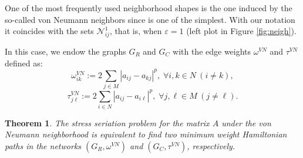 \documentclass[a4paper,11pt, reqno]{amsart}
\newtheorem{thm}{Theorem}
\def\N{\mathcal{N}}
\begin{document}
One of the most frequently used neighborhood shapes is the one induced by the so-called von Neumann neighbors since is one of the 
simplest. With our notation it coincides with the sets $\N_{ij}^1$, that is, when $\varepsilon=1$ (left plot in Figure \ref{fig:neigh}). 

In this case, we endow the graphs $G_R$ and $G_C$ with the edge weights $\omega^{VN}$ and $\tau^{VN}$ defined as:
$$
\omega^{VN}_{ik}:= 2\sum_{j\in M} |a_{ij} - a_{kj}|^p, \; \forall i, k \in N\ (i\neq k),
$$ 
$$
\tau^{VN}_{j\ell} := 2\sum_{i\in N} |a_{ij} - a_{i\ell}|^p, \; \forall j, 
\ell \in M\ (j\neq \ell).
$$
\begin{thm}\label{thm:1}
    The stress seriation problem for the matrix $A$ under the von Neumann neighborhood is equivalent to find two minimum weight Hamiltonian paths in the networks $(G_R,\omega^{VN})$ and $(G_C,\tau^{VN})$, respectively.
\end{thm}
\end{document}
